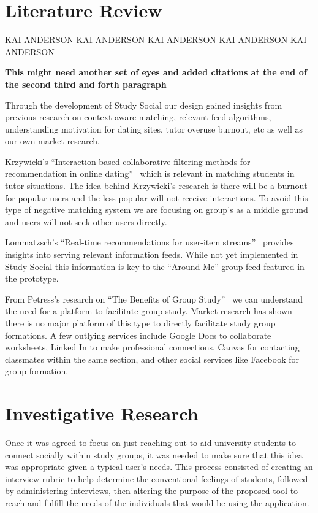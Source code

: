 \documentclass{sigchi-ext}
\begin{document}
\section{Literature Review}
KAI ANDERSON KAI ANDERSON KAI ANDERSON KAI ANDERSON KAI ANDERSON

\textbf{This might need another set of eyes and added citations at the end of the second third and forth paragraph}

Through the development of Study Social our design gained insights from
previous research on context-aware matching, relevant feed algorithms,
understanding motivation for dating sites, tutor overuse burnout, etc as well
as our own market research.

Krzywicki's ``Interaction-based collaborative filtering methods for
recommendation in online dating''~\cite{krzywicki2010interaction} which is
relevant in matching students in tutor situations. The idea behind
Krzywicki's research is there will be a burnout for popular users and the
less popular will not receive interactions.  To avoid this type of negative
matching system we are focusing on group's as a middle ground and users will
not seek other users directly.

Lommatzsch's ``Real-time recommendations for user-item
streams''~\cite{lommatzsch2015real} provides insights into serving relevant
information feeds. While not yet implemented in Study Social this information
is key to the ``Around Me'' group feed featured in the prototype.

From Petress's research on ``The Benefits of Group
Study''~\cite{petress2004benefits} we can understand the need for a platform
to facilitate group study. Market research has shown there is no major
platform of this type to directly facilitate study group formations. A few
outlying services include Google Docs to collaborate worksheets, Linked In to
make professional connections, Canvas for contacting classmates within the
same section, and other social services like Facebook for group formation.



\section{Investigative Research}
Once it was agreed to focus on just reaching out to aid university students
to connect socially within study groups, it was needed to make sure that
this idea was appropriate given a typical user's needs. This process
consisted of creating an interview rubric to help determine the
conventional feelings of students, followed by administering interviews,
then altering the purpose of the proposed tool to reach and fulfill the
needs of the individuals that would be using the application.
\end{document}
